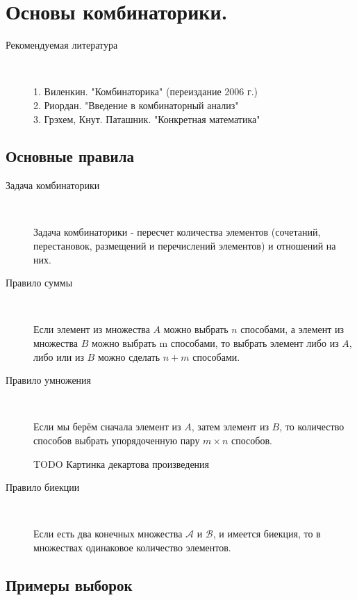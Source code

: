 \section{Основы комбинаторики.}

\begin{description}
\item[Рекомендуемая литература]~ 

1. Виленкин. "Комбинаторика" (переиздание 2006 г.) \\
2. Риордан. "Введение в комбинаторный анализ" \\
3. Грэхем, Кнут. Паташник. "Конкретная математика" \\
\end{description}

\subsection{Основные правила}

\begin{description}
\item[Задача комбинаторики]~	

Задача комбинаторики - пересчет количества элементов (сочетаний, перестановок, размещений и перечислений элементов) и отношений на них.

\item[Правило суммы]  ~

Если элемент из множества $A$ можно выбрать $n$ способами, а элемент из множества $B$ можно выбрать m способами, то выбрать элемент либо из $A$, либо или из $B$ можно сделать $n+m$ способами.

\item[Правило умножения]  ~

Если мы берём сначала элемент из $A$, затем элемент из $B$, то количество способов выбрать упорядоченную пару $m \times n $ способов.

TODO Картинка декартова произведения

\item[Правило биекции]  ~

Если есть два конечных множества $\mathcal{A}$ и $\mathcal{B}$, и имеется биекция, то в множествах одинаковое количество элементов. 
\end{description}

\subsection{Примеры выборок}

